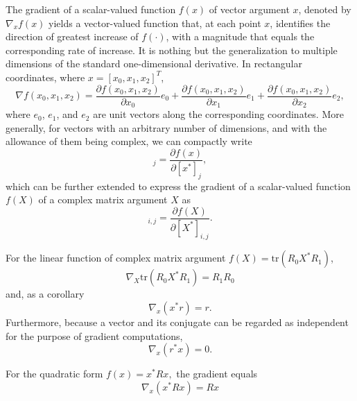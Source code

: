 \documentclass[a4paper, 12pt]{book}
\begin{document}
The gradient of a scalar-valued function $f(x)$ of vector argument $x$, denoted by $\nabla_{x}f(x)$ yields a vector-valued function that, at each point $x$, identifies the direction of greatest increase of $f(\cdot)$, with a magnitude that equals the corresponding rate of increase. It is nothing but the generalization to multiple dimensions of the standard one-dimensional derivative. In rectangular coordinates, where $x=[x_{0}, x_{1}, x_{2}]^T$,
\begin{equation}
    \nabla f(x_{0},x_{1},x_{2})=\frac{\partial f(x_{0},x_{1},x_{2})}{\partial x_{0}}e_{0}+\frac{\partial f(x_{0},x_{1},x_{2})}{\partial x_{1}}e_{1}+\frac{\partial f(x_{0},x_{1},x_{2})}{\partial x_{2}}e_{2}, \tag{D.1}
\end{equation}
where $e_{0}$, $e_{1}$, and $e_{2}$ are unit vectors along the corresponding coordinates. More generally, for vectors with an arbitrary number of dimensions, and with the allowance of them being complex, we can compactly write
\begin{equation}
    [\nabla_{x}f(x)]_{j}=\frac{\partial f(x)}{\partial[x^{*}]_{j}}, \tag{D.2}
\end{equation}
which can be further extended to express the gradient of a scalar-valued function $f(X)$ of a complex matrix argument $X$ as
\begin{equation}
    [\nabla_{X}f(X)]_{i,j}=\frac{\partial f(X)}{\partial[X^{*}]_{i,j}}. \tag{D.3}
\end{equation}

\begin{greenbox}[Example D.1]
For the linear function of complex matrix argument $f(X)=\text{tr}(R_{0}X^{*}R_{1})$,
\begin{equation}
    \nabla_{X}\text{tr}(R_{0}X^{*}R_{1})=R_{1}R_{0} \tag{D.4}
\end{equation}
and, as a corollary
\begin{equation}
    \nabla_{x}(x^{*}r)=r. \tag{D.5}
\end{equation}
Furthermore, because a vector and its conjugate can be regarded as independent for the purpose of gradient computations,
\begin{equation}
    \nabla_{x}(r^{*}x)=0. \tag{D.6}
\end{equation}
\end{greenbox}

\begin{greenbox}[Example D.2]
For the quadratic form $f(x)=x^{*}Rx,$ the gradient equals
\begin{equation}
    \nabla_{x}(x^{*}Rx)=Rx \tag{D.7}
\end{equation}
\end{greenbox}
\end{document}
